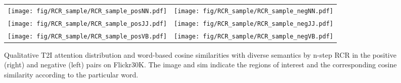 \documentclass[journal]{IEEEtran}\newcommand{\ignore}[1]{}
\begin{document}
\begin{figure*}[ht]
	\centering
	\begin{tabular}{@{}cc}
		\texttt{[image: fig/RCR\_sample/RCR\_sample\_posNN.pdf]}
		&\texttt{[image: fig/RCR\_sample/RCR\_sample\_negNN.pdf]}\\
		\texttt{[image: fig/RCR\_sample/RCR\_sample\_posJJ.pdf]}
		&\texttt{[image: fig/RCR\_sample/RCR\_sample\_negJJ.pdf]}\\
		\texttt{[image: fig/RCR\_sample/RCR\_sample\_posVB.pdf]}
		&\texttt{[image: fig/RCR\_sample/RCR\_sample\_negVB.pdf]}\\
	\end{tabular}
	\caption{Qualitative T2I attention distribution and word-based cosine similarities with diverse semantics by n-step RCR in the positive (right) and negative (left) pairs on Flickr30K. The image and sim indicate the regions of interest and the corresponding cosine similarity according to the particular word.}
	\label{fig:RCRsample}
\end{figure*}
\end{document}
